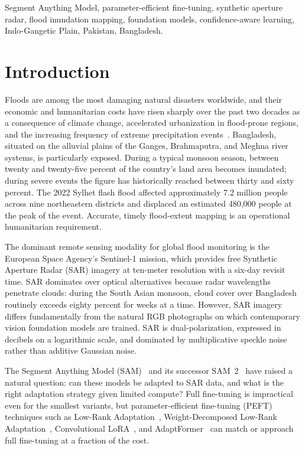 \documentclass[conference]{IEEEtran}
\begin{document}
\begin{IEEEkeywords}
Segment Anything Model, parameter-efficient fine-tuning, synthetic aperture radar, flood inundation mapping, foundation models, confidence-aware learning, Indo-Gangetic Plain, Pakistan, Bangladesh.
\end{IEEEkeywords}

\section{Introduction}
\label{sec:intro}

Floods are among the most damaging natural disasters worldwide, and their economic and humanitarian costs have risen sharply over the past two decades as a consequence of climate change, accelerated urbanization in flood-prone regions, and the increasing frequency of extreme precipitation events~\cite{Hu2025GlobalFloods}. Bangladesh, situated on the alluvial plains of the Ganges, Brahmaputra, and Meghna river systems, is particularly exposed. During a typical monsoon season, between twenty and twenty-five percent of the country's land area becomes inundated; during severe events the figure has historically reached between thirty and sixty percent. The 2022 Sylhet flash flood affected approximately 7.2 million people across nine northeastern districts and displaced an estimated 480{,}000 people at the peak of the event. Accurate, timely flood-extent mapping is an operational humanitarian requirement.

The dominant remote sensing modality for global flood monitoring is the European Space Agency's Sentinel-1 mission, which provides free Synthetic Aperture Radar (SAR) imagery at ten-meter resolution with a six-day revisit time. SAR dominates over optical alternatives because radar wavelengths penetrate clouds: during the South Asian monsoon, cloud cover over Bangladesh routinely exceeds eighty percent for weeks at a time. However, SAR imagery differs fundamentally from the natural RGB photographs on which contemporary vision foundation models are trained. SAR is dual-polarization, expressed in decibels on a logarithmic scale, and dominated by multiplicative speckle noise rather than additive Gaussian noise.

The Segment Anything Model (SAM)~\cite{Kirillov2023SAM} and its successor SAM~2~\cite{Ravi2025SAM2} have raised a natural question: can these models be adapted to SAR data, and what is the right adaptation strategy given limited compute? Full fine-tuning is impractical even for the smallest variants, but parameter-efficient fine-tuning (PEFT) techniques such as Low-Rank Adaptation~\cite{Hu2022LoRA}, Weight-Decomposed Low-Rank Adaptation~\cite{Liu2024DoRA}, Convolutional LoRA~\cite{Zhong2024ConvLoRA}, and AdaptFormer~\cite{Chen2022AdaptFormer} can match or approach full fine-tuning at a fraction of the cost.
\end{document}
